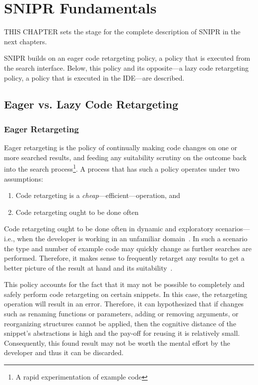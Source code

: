 \chapter{\uppercase{SnipR} Fundamentals}{}
\label{sec:fundamentals}


\lettrine[lraise=0.1, nindent=0em, slope=-.5em]{T} {HIS CHAPTER} sets the stage for the complete description of \uppercase{SnipR} in the next chapters.

\uppercase{SnipR} builds on an eager code retargeting policy, a policy that is executed from the search interface. Below, this policy and its opposite---a lazy code retargeting policy, a policy that is executed in the IDE---are described.

\section{Eager vs. Lazy Code Retargeting}
\label{sec:eagervslazy}

\subsection{Eager Retargeting}

Eager retargeting is the policy of continually making code changes on one or more searched results, and feeding any suitability scrutiny on the outcome back into the search process\footnote{A rapid experimentation of example code}. A process that has such a policy operates under two assumptions:

\begin{enumerate}
	\item Code retargeting is a \emph{cheap}---efficient---operation, and
	\item Code retargeting ought to be done often
\end{enumerate}

Code retargeting ought to be done often in dynamic and exploratory scenarios---i.e., when the developer is working in an unfamiliar domain~\cite{Brandt:2009ew}. In such a scenario the type and number of example code may quickly change as further searches are performed. Therefore, it makes sense to frequently retarget any results to get a better picture of the result at hand and its suitability~\cite{Fowler:1999vp, Brandt:2009ew}. 

This policy accounts for the fact that it may not be possible to completely and safely perform code retargeting on certain snippets. In this case, the retargeting operation will result in an error. Therefore, it can hypothesized that if changes such as renaming functions or parameters, adding or removing arguments, or reorganizing structures cannot be applied, then the cognitive distance of the snippet's abstractions is high and the pay-off for reusing it is relatively small. Consequently, this found result may not be worth the mental effort by the developer and thus it can be discarded.    

